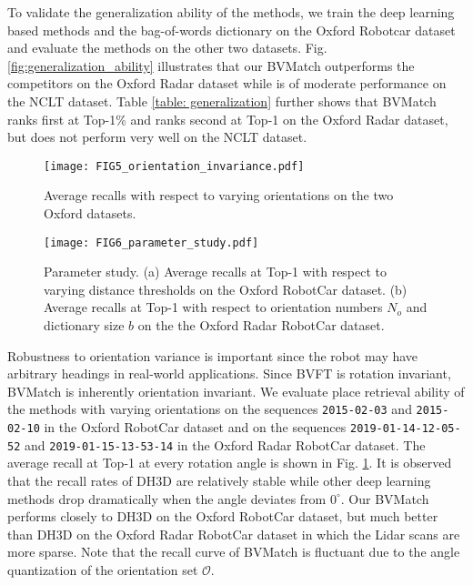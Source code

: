 \documentclass[letterpaper, 10 pt, journal, twoside]{IEEEtran}
\begin{document}
To validate the generalization ability of the methods, we train the deep learning based methods and the bag-of-words dictionary on the Oxford Robotcar dataset and evaluate the methods on the other two datasets. {Fig. \ref{fig:generalization_ability} illustrates that our BVMatch outperforms the competitors on the Oxford Radar dataset while is of moderate performance on the NCLT dataset}. {Table \ref{table: generalization} further shows that BVMatch ranks first at Top-1\% and ranks second at Top-1 on the Oxford Radar dataset, but does not perform very well on the NCLT dataset.}


\begin{figure}
	\centering
	\texttt{[image: FIG5\_orientation\_invariance.pdf]}
	\caption{Average recalls with respect to varying orientations on the two Oxford datasets. }
	\label{fig: rotation invariance} %
\end{figure}


\begin{figure}
	\centering
	\texttt{[image: FIG6\_parameter\_study.pdf]}
	\caption{Parameter study. (a) Average recalls at Top-1  with respect to varying distance thresholds on the Oxford RobotCar dataset. (b) Average recalls at Top-1 with respect to orientation numbers $N_o$ and dictionary size $b$ on the the Oxford Radar RobotCar dataset.}
	\label{fig:parameter_study} %
\end{figure}



Robustness to orientation variance is important since the robot may have arbitrary headings in real-world applications. Since BVFT is rotation invariant, BVMatch is inherently orientation invariant. We evaluate place retrieval ability of the methods with varying orientations on the sequences \texttt{2015-02-03} and \texttt{2015-02-10} in the Oxford RobotCar dataset and {on the sequences \texttt{2019-01-14-12-05-52} and \texttt{2019-01-15-13-53-14} in the Oxford Radar RobotCar dataset}. The average recall at Top-1 at every rotation angle is shown in Fig. \ref{fig: rotation invariance}. It is observed that the recall rates of DH3D are relatively stable while other deep learning methods drop dramatically when the angle deviates from $0^\circ$. Our BVMatch performs closely to DH3D on the Oxford RobotCar dataset, but much better than DH3D on the Oxford Radar RobotCar dataset in which the Lidar scans are more sparse. Note that the recall curve of BVMatch is fluctuant due to the angle quantization of the orientation set $\mathcal{O}$. 
\end{document}
